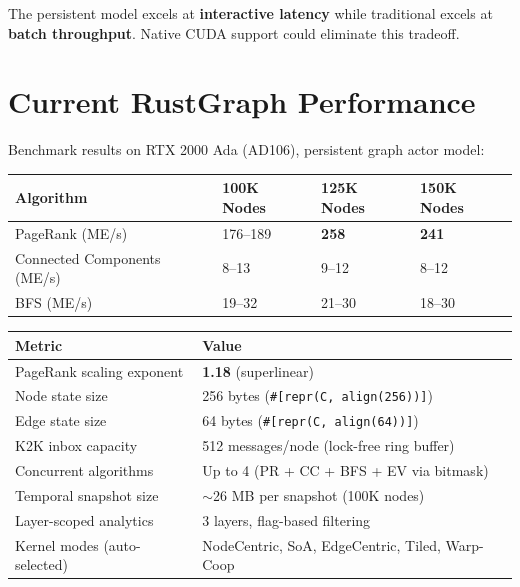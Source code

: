 \documentclass[11pt,a4paper]{article}
\begin{document}
The persistent model excels at \textbf{interactive latency} while traditional excels at \textbf{batch throughput}. Native CUDA support could eliminate this tradeoff.

\section{Current RustGraph Performance}

Benchmark results on RTX 2000 Ada (AD106), persistent graph actor model:

\begin{table}[h]
\centering
\begin{tabular}{@{}llll@{}}
\toprule
\textbf{Algorithm} & \textbf{100K Nodes} & \textbf{125K Nodes} & \textbf{150K Nodes} \\
\midrule
PageRank (ME/s) & 176--189 & \textbf{258} & \textbf{241} \\
Connected Components (ME/s) & 8--13 & 9--12 & 8--12 \\
BFS (ME/s) & 19--32 & 21--30 & 18--30 \\
\bottomrule
\end{tabular}
\end{table}

\begin{table}[h]
\centering
\begin{tabular}{@{}ll@{}}
\toprule
\textbf{Metric} & \textbf{Value} \\
\midrule
PageRank scaling exponent & \textbf{1.18} (superlinear) \\
Node state size & 256 bytes (\texttt{\#[repr(C, align(256))]}) \\
Edge state size & 64 bytes (\texttt{\#[repr(C, align(64))]}) \\
K2K inbox capacity & 512 messages/node (lock-free ring buffer) \\
Concurrent algorithms & Up to 4 (PR + CC + BFS + EV via bitmask) \\
Temporal snapshot size & $\sim$26 MB per snapshot (100K nodes) \\
Layer-scoped analytics & 3 layers, flag-based filtering \\
Kernel modes (auto-selected) & NodeCentric, SoA, EdgeCentric, Tiled, Warp-Coop \\
\bottomrule
\end{tabular}
\end{table}
\end{document}
